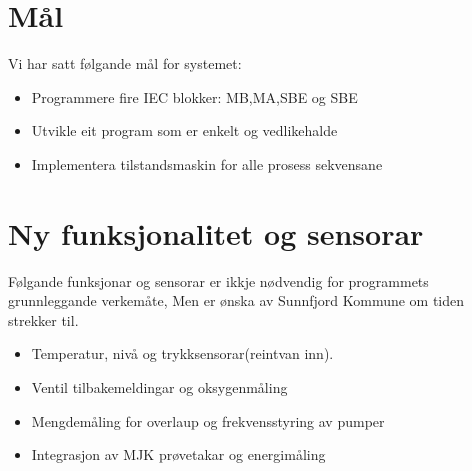 \newpage
\section{Mål}
Vi har satt følgande mål for systemet:

\begin{itemize}
    \item Programmere fire \gls{IEC} blokker: MB,MA,SBE og SBE
    \item Utvikle eit program som er enkelt og vedlikehalde
    \item Implementera tilstandsmaskin for alle prosess sekvensane
\end{itemize}

\section{Ny funksjonalitet og sensorar}
Følgande funksjonar og sensorar er ikkje nødvendig for programmets grunnleggande verkemåte, Men 
er ønska av \gls{Sunnfjord Kommune} om tiden strekker til.  
\begin{itemize}
    \item Temperatur, nivå og trykksensorar(reintvan inn).
    \item Ventil tilbakemeldingar og oksygenmåling
    \item Mengdemåling for overlaup og frekvensstyring av pumper
    \item Integrasjon av MJK prøvetakar og energimåling
\end{itemize}


